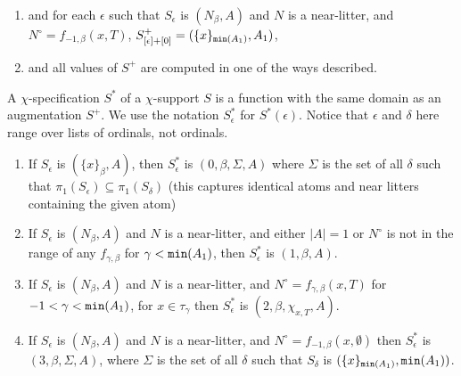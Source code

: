 \documentclass[112pt]{article}
\begin{document}
\begin{description}
\begin{enumerate}
\item and for each $\epsilon$ such that $S_\epsilon$ is $(N_\beta,A)$ and $N$ is a near-litter, and $N^\circ=f_{-1,\beta}(x,T)$, $S^+_{[\epsilon]+[0]} = (\{x\}_{{\tt min}(A_1)},A_1)$,

\item and all values of $S^+$ are computed in one of the ways described.


\end{enumerate}

A $\chi$-specification $S^*$ of a $\chi$-support $S$ is a function with the same domain as an augmentation $S^+$.  We use the notation $S^*_\epsilon$ for $S^*(\epsilon)$.  Notice that $\epsilon$ and $\delta$ here range over lists of ordinals, not ordinals.

\begin{enumerate}

\item  If $S_{\epsilon}$ is $(\{x\}_\beta,A)$, then $S^*_\epsilon$ is $(0,\beta,\Sigma,A)$ where  $\Sigma$ is the set of all $\delta$ such that $\pi_1(S_\epsilon) \subseteq \pi_1(S_\delta)$ (this captures identical atoms and near litters containing the given atom)

\item  If $S_\epsilon$ is $(N_\beta,A)$ and $N$ is a near-litter, and either $|A|=1$ or $N^\circ$ is not in the range of any $f_{\gamma,\beta}$ for $\gamma<{\tt min}(A_1)$, then $S^*_\epsilon$ is $(1,\beta,A)$.

\item  If $S_\epsilon$ is $(N_\beta,A)$ and $N$ is a near-litter, and $N^\circ=f_{\gamma,\beta}(x,T)$ for $-1<\gamma<{\tt min}(A_1)$, for $x\in \tau_\gamma$ then 
$S^*_\epsilon$ is $(2,\beta,\chi_{x,T},A)$.  

\item  If $S_\epsilon$ is $(N_\beta,A)$ and $N$ is a near-litter, and $N^\circ=f_{-1,\beta}(x,\emptyset)$  then $S^*_\epsilon$ is $(3,\beta,\Sigma,A)$, where  $\Sigma$ is the set of all $\delta$ such that $S_\delta$ is $(\{x\}_{{\tt min}(A_1)},{\tt min}(A_1))$.

\end{enumerate}

\begin{comment}
A $\chi$-specification $S^*$ of a $\chi$-support $S$ is a function with the same domain as $S$.  We use the notation $S^*_\epsilon$ for $S^*(\epsilon)$.

\begin{enumerate}


\end{comment}
\end{description}
\end{document}
